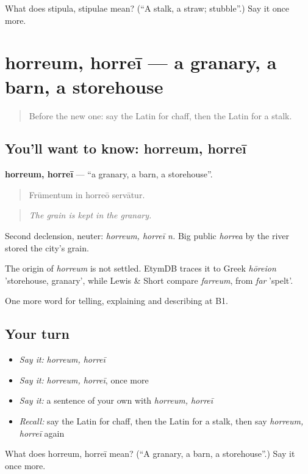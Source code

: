 \begin{tcolorbox}[breakable,colback=teal!4,colframe=teal!35!black,title={Before you move on}]
What does stipula, stipulae mean? (\textquotedblleft{}A stalk, a straw; stubble\textquotedblright{}.) Say it once more.
\end{tcolorbox}
\section[horreum, horreī]{horreum, horreī — a granary, a barn, a storehouse}

\label{lesson:LA-C476-horreum}



\begin{quote}
Before the new one: say the Latin for chaff, then the Latin for a stalk.
\end{quote}

\subsection*{You'll want to know: horreum, horreī}
\textbf{horreum, horreī} — \textquotedblleft{}a granary, a barn, a storehouse\textquotedblright{}.

\begin{quote}
Frūmentum in horreō servātur.
\end{quote}

\begin{quote}
\emph{The grain is kept in the granary.}
\end{quote}

Second declension, neuter: \emph{horreum, horreī n.} Big public \emph{horrea} by the river stored the city's grain.

\begin{cousinweb}
The origin of \emph{horreum} is not settled. EtymDB traces it to Greek \emph{hōreion} 'storehouse, granary', while Lewis \& Short compare \emph{farreum}, from \emph{far} 'spelt'.
\end{cousinweb}

\begin{grammarlens}[title={What you've built}]
One more word for telling, explaining and describing at B1.
\end{grammarlens}

\subsection*{Your turn}
\begin{itemize}
\raggedright
  \item \emph{Say it:} \emph{horreum, horreī}
  \item \emph{Say it:} \emph{horreum, horreī}, once more
  \item \emph{Say it:} a sentence of your own with \emph{horreum, horreī}
  \item \emph{Recall:} say the Latin for chaff, then the Latin for a stalk, then say \emph{horreum, horreī} again
\end{itemize}

\begin{tcolorbox}[breakable,colback=teal!4,colframe=teal!35!black,title={Before you move on}]
What does horreum, horreī mean? (\textquotedblleft{}A granary, a barn, a storehouse\textquotedblright{}.) Say it once more.
\end{tcolorbox}
